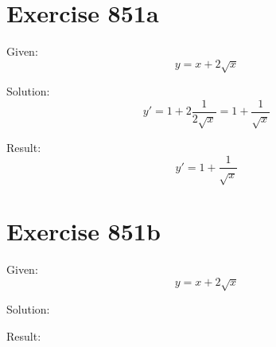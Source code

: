 \documentclass[a4paper, 10pt]{scrartcl}
\begin{document}
\section{Exercise 851a}

Given:
\[
y = x + 2\sqrt{x}
\]

Solution:
\[
y' = 1 + 2\frac{1}{2\sqrt{x}} = 1 + \frac{1}{\sqrt{x}}
\]

Result:
\[
y' = 1 + \frac{1}{\sqrt{x}}
\]

\section{Exercise 851b}

Given:
\[
y = x + 2\sqrt{x}
\]

Solution:

Result:
\end{document}
